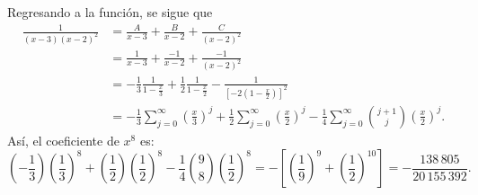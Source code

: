 \begin{BOX}
    Regresando a la función, se sigue que
    \begin{align*}
        \frac{1}{(x-3)(x-2)^2} & = \frac{A}{x-3} + \frac{B}{x-2} + \frac{C}{(x-2)^{2}} \\
        & = \frac{1}{x-3} + \frac{-1}{x-2} + \frac{-1}{(x-2)^{2}} \\
        & = - \frac{1}{3} \frac{1}{1-\frac{x}{3}} + \frac{1}{2} \frac{1}{1-\frac{x}{2}} - \frac{1}{\left[ - 2 \left( 1-\frac{x}{2} \right) \right]^{2}} \\
        & = -\frac{1}{3} \sum_{j=0}^{\infty} \left( \frac{x}{3} \right)^{j} + \frac{1}{2} \sum_{j=0}^{\infty} \left( \frac{x}{2} \right)^{j} - \frac{1}{4} \sum_{j=0}^{\infty} \binom{j+1}{j} \left( \frac{x}{2} \right)^{j}.
    \end{align*}
    Así, el coeficiente de $x^{8}$ es:
    $$\left( - \frac{1}{3} \right) \left( \frac{1}{3} \right)^{8} + \left( \frac{1}{2} \right) \left( \frac{1}{2} \right)^{8} - \frac{1}{4} \binom{9}{8} \left( \frac{1}{2} \right)^{8} = - \left[ \left( \frac{1}{9} \right)^{9} + \left( \frac{1}{2} \right)^{10} \right] = - \frac{138 \, 805}{20 \, 155 \, 392}.$$
\end{BOX}

